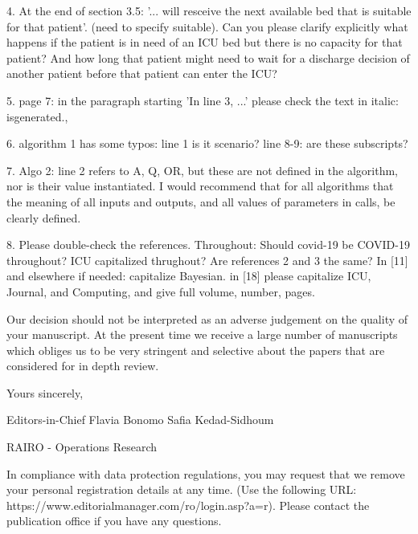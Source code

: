 4. At the end of section 3.5: '... will resceive the next available bed that is suitable for that patient'. (need to specify suitable). Can you please clarify explicitly what happens if the patient is in need of an ICU bed but there is no capacity for that patient? And how long that patient might need to wait for a discharge decision of another patient before that patient can enter the ICU?

5. page 7: in the paragraph starting 'In line 3, ...' please check the text in italic: isgenerated.,

6. algorithm 1 has some typos: line 1 is it scenario? line 8-9: are these subscripts?

7. Algo 2: line 2 refers to A, Q, OR, but these are not defined in the algorithm, nor is their value instantiated. I would recommend that for all algorithms that the meaning of all inputs and outputs, and all values of parameters in calls, be clearly defined.

8. Please double-check the references. Throughout: Should covid-19 be COVID-19 throughout? ICU capitalized thrughout? Are references 2 and 3 the same? In [11] and elsewhere if needed: capitalize Bayesian. in [18] please capitalize ICU, Journal, and Computing, and give full volume, number, pages.


Our decision should not be interpreted as an adverse judgement on the quality of your manuscript.
At the present time we receive a large number of manuscripts which obliges us to be very stringent and selective about the papers that are considered for in depth review.

Yours sincerely,

Editors-in-Chief
Flavia Bonomo
Safia Kedad-Sidhoum

RAIRO - Operations Research

In compliance with data protection regulations, you may request that we remove your personal registration details at any time. (Use the following URL: https://www.editorialmanager.com/ro/login.asp?a=r). Please contact the publication office if you have any questions.
